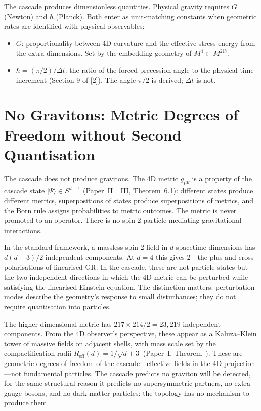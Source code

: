 \documentclass[12pt,a4paper]{article}
\begin{document}
The cascade produces dimensionless quantities. Physical gravity requires $G$ (Newton) and
$\hbar$ (Planck). Both enter as unit-matching constants when geometric rates are identified
with physical observables:

\begin{itemize}
\item $G$: proportionality between 4D curvature and the effective stress-energy from the
extra dimensions. Set by the embedding geometry of $M^4 \subset M^{217}$.
\item $\hbar = (\pi/2)/\Delta t$: the ratio of the forced precession angle to the physical time increment
(Section 9 of [2]). The angle $\pi/2$ is derived; $\Delta t$ is not.
\end{itemize}

\section{No Gravitons: Metric Degrees of Freedom without Second Quantisation}\label{sec:no-gravitons}

The cascade does not produce gravitons. The 4D metric $g_{\mu\nu}$ is a property
of the cascade state $|\Psi\rangle \in S^{d-1}$ (Paper~II\,=\,III, Theorem~6.1):
different states produce different metrics, superpositions of states produce
superpositions of metrics, and the Born rule assigns probabilities to metric
outcomes. The metric is never promoted to an operator. There is no spin-2
particle mediating gravitational interactions.

In the standard framework, a massless spin-2 field in $d$ spacetime dimensions
has $d(d-3)/2$ independent components. At $d = 4$ this gives 2---the plus and
cross polarisations of linearised GR. In the cascade, these are not particle
states but the two independent directions in which the 4D metric can be
perturbed while satisfying the linearised Einstein equation. The distinction
matters: perturbation modes describe the geometry's response to small
disturbances; they do not require quantisation into particles.

The higher-dimensional metric has $217 \times 214/2 = 23{,}219$ independent
components. From the 4D observer's perspective, these appear as a
Kaluza--Klein tower of massive fields on adjacent shells, with mass scale
set by the compactification radii $R_{\text{eff}}(d) = 1/\sqrt{d+3}$
(Paper~I, Theorem~). These are geometric degrees of freedom of the
cascade---effective fields in the 4D projection---not fundamental particles.
The cascade predicts no graviton will be detected, for the same structural
reason it predicts no supersymmetric partners, no extra gauge bosons, and
no dark matter particles: the topology has no mechanism to produce them.
\end{document}
